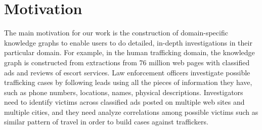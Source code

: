 \section{Motivation}
\label{sec:motivation}
The main motivation for our work is the construction of domain-specific knowledge graphs to enable users to do detailed, in-depth investigations in their particular domain.
For example, in the human trafficking domain, the knowledge graph is constructed from extractions from 76 million web pages with classified ads and reviews of escort services.
Law enforcement officers investigate possible trafficking cases by following leads using all the pieces of information they have, such as phone numbers, locations, names, physical descriptions.
Investigators need to identify victims across classified ads posted on multiple web sites and multiple cities, and they need analyze correlations among possible victims such as similar pattern of travel in order to build cases against traffickers.